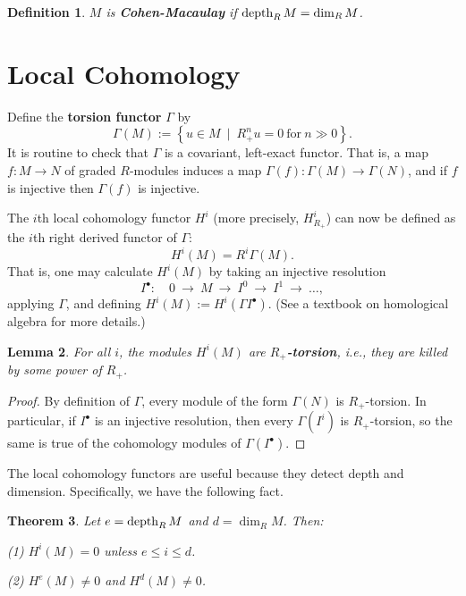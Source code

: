 \documentclass{amsart}
\newtheorem{thm}{Theorem}
\newtheorem{defn}[thm]{Definition}
\newtheorem{lemma}[thm]{Lemma}
\newcommand{\st}{~\mid~}
\newcommand{\0}{\emptyset}
\newcommand{\depth}{\mathop{\rm depth}\nolimits}
\newcommand{\defterm}[1] {{\bf #1}}
\begin{document}
\begin{defn}
$M$ is \defterm{Cohen-Macaulay} if $\depth_R M = \dim_R M$.
\end{defn}

\section{Local Cohomology}

Define the \defterm{torsion functor} $\Gamma$ by
	$$\Gamma(M) := \left\{u \in M \st R_+^n u = 0 ~\text{for}~ n \gg 0 \right\}.$$
It is routine to check that $\Gamma$ is a covariant, left-exact functor.  That is, a map $f: M 
\to N$ of graded $R$-modules induces a map $\Gamma(f): \Gamma(M) \to \Gamma(N)$, and if $f$ is 
injective then $\Gamma(f)$ is injective.

The $i$th local cohomology functor $H^i$ (more precisely, $H^i_{R_+}$) can now be defined as 
the $i$th right derived functor of $\Gamma$:
	$$H^i(M) = R^i \Gamma (M).$$
That is, one may calculate $H^i(M)$ by taking an injective resolution
	$$I^\bullet: \quad 0 ~\to~ M ~\to~ I^0 ~\to~ I^1 ~\to~ \dots,$$
applying $\Gamma$, and defining $H^i(M) := H^i(\Gamma I^\bullet)$.
(See a textbook on homological algebra for more details.)

\begin{lemma} \label{torsion}
For all $i$, the modules $H^i(M)$ are \defterm{$R_+$-torsion}, i.e., they are killed by some 
power of $R_+$.
\end{lemma}

\begin{proof}
By definition of $\Gamma$, every module of the form $\Gamma(N)$ is $R_+$-torsion.  In 
particular, if $I^\bullet$ is an injective resolution, then every $\Gamma(I^i)$ is $R_+$-torsion, 
so the same is true of the cohomology modules of $\Gamma(I^\bullet)$.
\end{proof}

The local cohomology functors are useful because they detect depth and dimension.  
Specifically, we have the following fact.

\begin{thm} Let $e = \depth_R M$ and $d = \dim_R M$.  Then:

\noindent (1) \quad $H^i(M)=0$ unless $e \leq i \leq d$.

\noindent (2) \quad $H^e(M) \neq 0$ and $H^d(M) \neq 0$.

\end{thm}
\end{document}
